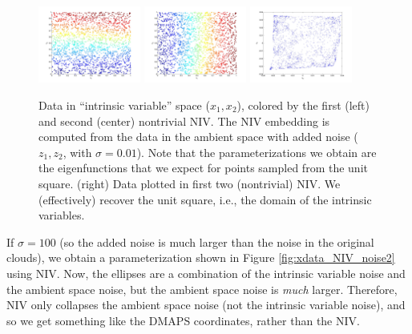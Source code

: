 \documentclass[12pt]{article}
\begin{document}
\begin{figure}[H]
\includegraphics[width=0.3\textwidth]{xdata_noise1_colored_NIV1}
\includegraphics[width=0.3\textwidth]{xdata_noise1_colored_NIV2}
\includegraphics[width=0.3\textwidth]{embedding_noise1}
\caption{Data in ``intrinsic variable'' space ($x_1, x_2$), colored by the first (left) and second (center) nontrivial NIV. The NIV embedding is computed from the data in the ambient space with added noise ($z_1, z_2$, with $\sigma = 0.01$). Note that the parameterizations we obtain are the eigenfunctions that we expect for points sampled from the unit square. (right) Data plotted in first two (nontrivial) NIV. We (effectively) recover the unit square, i.e., the domain of the intrinsic variables. }
\label{fig:xdata_NIV_noise1}
\end{figure}

If $\sigma = 100$ (so the added noise is much larger than the noise in the original clouds), we obtain a parameterization shown in Figure \ref{fig:xdata_NIV_noise2} using NIV.
%
Now, the ellipses are a combination of the intrinsic variable noise and the ambient space noise, but the ambient space noise is {\em much} larger. 
%
Therefore, NIV only collapses the ambient space noise (not the intrinsic variable noise), and so we get something like the DMAPS coordinates, rather than the NIV. 
\end{document}
